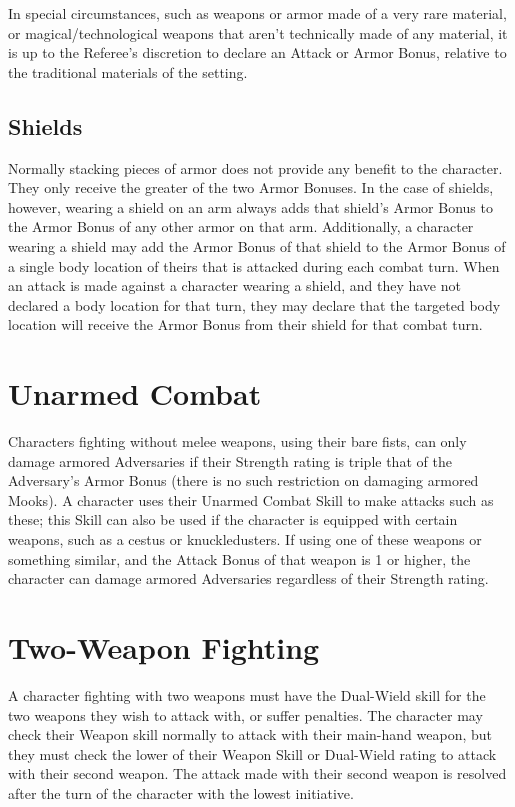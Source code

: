 \documentclass[oneside]{book}
\begin{document}
\begin{multicols}{2}
In special circumstances, such as weapons or armor made of a very rare material, or magical/technological weapons that aren't technically made of any material, it is up to the Referee's discretion to declare an Attack or Armor Bonus, relative to the traditional materials of the setting. 

\subsection{Shields}
Normally stacking pieces of armor does not provide any benefit to the character. They only receive the greater of the two Armor Bonuses. In the case of shields, however, wearing a shield on an arm always adds that shield's Armor Bonus to the Armor Bonus of any other armor on that arm. Additionally, a character wearing a shield may add the Armor Bonus of that shield to the Armor Bonus of a single body location of theirs that is attacked during each combat turn. When an attack is made against a character wearing a shield, and they have not declared a body location for that turn, they may declare that the targeted body location will receive the Armor Bonus from their shield for that combat turn. 

\section{Unarmed Combat}
Characters fighting without melee weapons, using their bare fists, can only damage armored Adversaries if their Strength rating is triple that of the Adversary's Armor Bonus (there is no such restriction on damaging armored Mooks). A character uses their Unarmed Combat Skill to make attacks such as these; this Skill can also be used if the character is equipped with certain weapons, such as a cestus or knuckledusters. If using one of these weapons or something similar, and the Attack Bonus of that weapon is 1 or higher, the character can damage armored Adversaries regardless of their Strength rating.  

\section{Two-Weapon Fighting}
A character fighting with two weapons must have the Dual-Wield skill for the two weapons they wish to attack with, or suffer penalties. The character may check their Weapon skill normally to attack with their main-hand weapon, but they must check the lower of their Weapon Skill or Dual-Wield rating to attack with their second weapon. The attack made with their second weapon is resolved after the turn of the character with the lowest initiative. 


\end{multicols}
\end{document}
